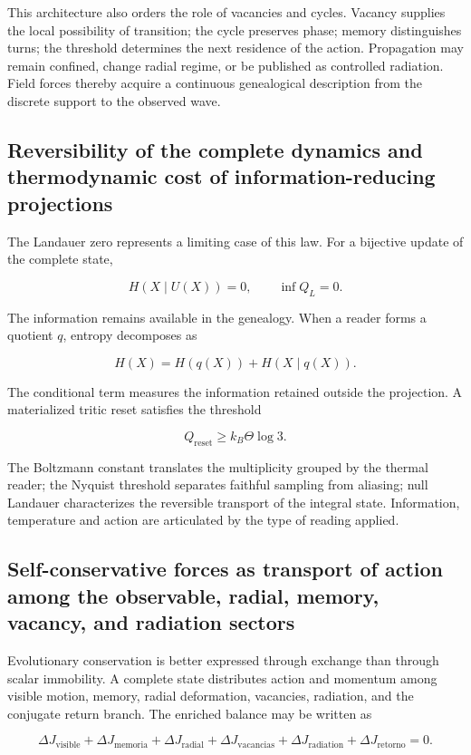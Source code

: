 This architecture also orders the role of vacancies and cycles. Vacancy supplies the local possibility of transition; the cycle preserves phase; memory distinguishes turns; the threshold determines the next residence of the action. Propagation may remain confined, change radial regime, or be published as controlled radiation. Field forces thereby acquire a continuous genealogical description from the discrete support to the observed wave.

\subsection{Reversibility of the complete dynamics and thermodynamic cost of information-reducing projections}
The Landauer zero represents a limiting case of this law. For a bijective update of the complete state,

\[
H(X\mid U(X))=0,
\qquad
\inf Q_L=0.
\]

The information remains available in the genealogy. When a reader forms a quotient \(q\), entropy decomposes as

\[
H(X)=H(q(X))+H(X\mid q(X)).
\]

The conditional term measures the information retained outside the projection. A materialized tritic reset satisfies the threshold

\[
Q_{\mathrm{reset}}\ge k_B\Theta\log 3.
\]

The Boltzmann constant translates the multiplicity grouped by the thermal reader; the Nyquist threshold separates faithful sampling from aliasing; null Landauer characterizes the reversible transport of the integral state. Information, temperature and action are articulated by the type of reading applied.

\subsection{Self-conservative forces as transport of action among the observable,
radial, memory, vacancy, and radiation sectors}

Evolutionary conservation is better expressed through exchange than through scalar immobility. A complete state distributes action and momentum among visible motion, memory, radial deformation, vacancies, radiation, and the conjugate return branch. The enriched balance may be written as

\[
\Delta J_{\mathrm{visible}}
+\Delta J_{\mathrm{memoria}}
+\Delta J_{\mathrm{radial}}
+\Delta J_{\mathrm{vacancias}}
+\Delta J_{\text{radiation}}
+\Delta J_{\mathrm{retorno}}
=0.
\]

